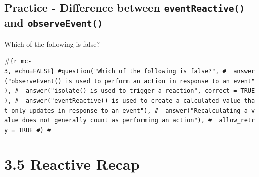 \documentclass[
  letterpaper,
  DIV=11,
  numbers=noendperiod]{scrreprt}
\newenvironment{Shaded}{\begin{snugshade}}{\end{snugshade}}
\newcommand{\AttributeTok}[1]{\textcolor[rgb]{0.40,0.46,0.14}{#1}}
\newcommand{\CommentTok}[1]{\textcolor[rgb]{0.37,0.37,0.37}{#1}}
\newcommand{\FunctionTok}[1]{\textcolor[rgb]{0.28,0.35,0.67}{#1}}
\newcommand{\NormalTok}[1]{\textcolor[rgb]{0.00,0.46,0.62}{#1}}
\newcommand{\OtherTok}[1]{\textcolor[rgb]{0.00,0.46,0.62}{#1}}
\newcommand{\SpecialCharTok}[1]{\textcolor[rgb]{0.37,0.37,0.37}{#1}}
\begin{document}
\begin{Shaded}
\end{Shaded}

\hypertarget{practice---difference-between-eventreactive-and-observeevent}{%
\subsection{\texorpdfstring{Practice - Difference between
\texttt{eventReactive()} and
\texttt{observeEvent()}}{Practice - Difference between eventReactive() and observeEvent()}}\label{practice---difference-between-eventreactive-and-observeevent}}

Which of the following is false?

\#\texttt{\{r\ mc-3,\ echo=FALSE\}\ \#question("Which\ of\ the\ following\ is\ false?",\ \#\ \ answer("\textasciigrave{}observeEvent()\textasciigrave{}\ is\ used\ to\ perform\ an\ action\ in\ response\ to\ an\ event"),\ \#\ \ answer("\textasciigrave{}isolate()\textasciigrave{}\ is\ used\ to\ trigger\ a\ reaction",\ correct\ =\ TRUE),\ \#\ \ answer("\textasciigrave{}eventReactive()\textasciigrave{}\ is\ used\ to\ create\ a\ calculated\ value\ that\ only\ updates\ in\ response\ to\ an\ event"),\ \#\ \ answer("Recalculating\ a\ value\ does\ not\ generally\ count\ as\ performing\ an\ action"),\ \#\ \ allow\_retry\ =\ TRUE\ \#)\ \#}

\hypertarget{reactive-recap}{%
\section{3.5 Reactive Recap}\label{reactive-recap}}
\end{document}
